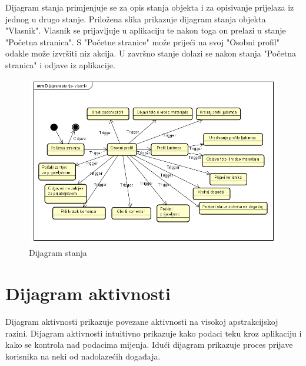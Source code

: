 			Dijagram stanja primjenjuje se za opis stanja objekta i za opisivanje prijelaza iz jednog u drugo stanje. Priložena slika prikazuje dijagram stanja objekta "Vlasnik". Vlasnik se prijavljuje u aplikaciju te nakon toga on prelazi u stanje "Početna stranica". S "Početne stranice" može prijeći na svoj "Osobni profil" odakle može izvršiti niz akcija. U završno stanje dolazi se nakon stanja "Početna stranica" i odjave iz aplikacije.
			\begin{figure}[H]
				\includegraphics[width=\textwidth]{slike/Dijagram_stanja_vlasnik.png}
				\centering
				\caption{Dijagram stanja}
				\label{fig:classd_middle}
			\end{figure}
			
			
			\eject 
		
		\section{Dijagram aktivnosti}
			
			Dijagram aktivnosti prikazuje povezane aktivnosti na visokoj apstrakcijskoj razini. Dijagram aktivnosti intuitivno prikazuje kako podaci teku kroz aplikaciju i kako se kontrola nad podacima mijenja. Idući dijagram prikazuje proces prijave korisnika na neki od nadolazećih događaja.
			
